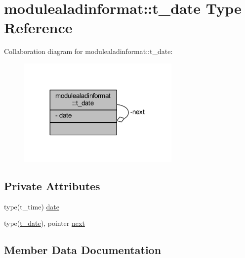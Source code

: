 \hypertarget{structmodulealadinformat_1_1t__date}{}\section{modulealadinformat\+:\+:t\+\_\+date Type Reference}
\label{structmodulealadinformat_1_1t__date}


Collaboration diagram for modulealadinformat\+:\+:t\+\_\+date\+:\nopagebreak
\begin{figure}[H]
\begin{center}
\leavevmode
\includegraphics[width=224pt]{structmodulealadinformat_1_1t__date__coll__graph}
\end{center}
\end{figure}
\subsection*{Private Attributes}
\begin{DoxyCompactItemize}
\item 
type(t\+\_\+time) \mbox{\hyperlink{structmodulealadinformat_1_1t__date_a125b6939b2ba81fb8e9bac10481ea303}{date}}
\item 
type(\mbox{\hyperlink{structmodulealadinformat_1_1t__date}{t\+\_\+date}}), pointer \mbox{\hyperlink{structmodulealadinformat_1_1t__date_abe677097b74750da796ea6d7188e9671}{next}}
\end{DoxyCompactItemize}


\subsection{Member Data Documentation}
\mbox{\label{structmodulealadinformat_1_1t__date_a125b6939b2ba81fb8e9bac10481ea303}} 
